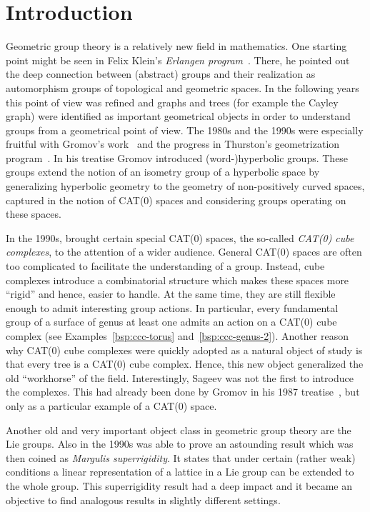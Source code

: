 \section{Introduction}
\label{sec:introduction}

Geometric group theory is a relatively new field in mathematics. One starting point might be seen in Felix Klein's \emph{Erlangen program}~\cite{Klein}. There, he pointed out the deep connection between (abstract) groups and their realization as automorphism groups of topological and geometric spaces. In the following years this point of view was refined and graphs and trees (for example the Cayley graph) were identified as important geometrical objects in order to understand groups from a geometrical point of view. The 1980s and the 1990s were especially fruitful with Gromov's work\ \cite{MR919829} and the progress in Thurston's geometrization program\ \cite{MR648524}. In his treatise Gromov introduced (word-)hyperbolic groups. These groups extend the notion of an isometry group of a hyperbolic space by generalizing hyperbolic geometry to the geometry of non-positively curved spaces, captured in the notion of CAT(0) spaces and considering groups operating on these spaces.

In the 1990s, \textcite{MR1347406} brought certain special CAT(0) spaces, the so-called \emph{CAT(0) cube complexes}, to the attention of a wider audience. General CAT(0) spaces are often too complicated to facilitate the understanding of a group. Instead, cube complexes introduce a combinatorial structure which makes these spaces more \enquote{rigid} and hence, easier to handle. At the same time, they are still flexible enough to admit interesting group actions. In particular, every fundamental group of a surface of genus at least one admits an action on a CAT(0) cube complex (see Examples~\ref{bsp:ccc-torus} and\ \ref{bsp:ccc-genus-2}). Another reason why CAT(0) cube complexes were quickly adopted as a natural object of study is that every tree is a CAT(0) cube complex. Hence, this new object generalized the old \enquote{workhorse} of the field. Interestingly, Sageev was not the first to introduce the complexes. This had already been done by Gromov in his 1987 treatise\ \cite{MR919829}, but only as a particular example of a CAT(0) space.

Another old and very important object class in geometric group theory are the Lie groups. Also in the 1990s \textcite{MR1090825} was able to prove an astounding result which was then coined as \emph{Margulis superrigidity}. It states that under certain (rather weak) conditions a linear representation of a lattice in a Lie group can be extended to the whole group. This superrigidity result had a deep impact and it became an objective to find analogous results in slightly different settings.

